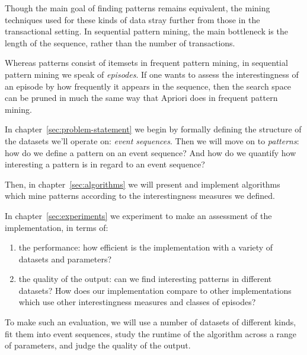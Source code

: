 Though the main goal of finding patterns remains equivalent, the mining techniques used for these kinds of data stray further from those in the transactional setting. In sequential pattern mining, the main bottleneck is the length of the sequence, rather than the number of transactions.

Whereas patterns consist of itemsets in frequent pattern mining, in sequential pattern mining we speak of \emph{episodes}. If one wants to assess the interestingness of an episode by how frequently it appears in the sequence, then the search space can be pruned in much the same way that Apriori does in frequent pattern mining.

In chapter~\ref{sec:problem-statement} we begin by formally defining the structure of the datasets we'll operate on: \emph{event sequences}. Then we will move on to \emph{patterns}: how do we define a pattern on an event sequence?
And how do we quantify how interesting a pattern is in regard to an event sequence?

Then, in chapter~\ref{sec:algorithms} we will present and implement algorithms which mine patterns according to the interestingness measures we defined.

In chapter~\ref{sec:experiments} we experiment to make an assessment of the implementation, in terms of:

\begin{enumerate}
\item the performance: how efficient is the implementation with a variety of datasets and parameters?
\item the quality of the output: can we find interesting patterns in different datasets? How does our implementation compare to other implementations which use other interestingness measures and classes of episodes?
\end{enumerate}

To make such an evaluation, we will use a number of datasets of different kinds, fit them into event sequences, study the runtime of the algorithm across a range of parameters, and judge the quality of the output.

